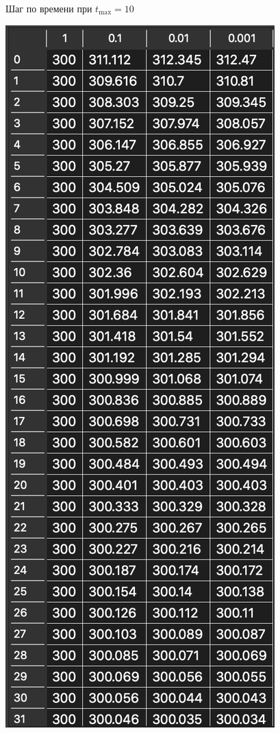 \begin{enumerate}
\begin{minipage}{0.5\textwidth}
\begin{flushleft}
\begin{figure}[H]
                    \caption{Шаг по времени при $t_\text{max} = 10$}
                    \label{img:steptau10}
                \end{figure}
            \end{flushleft}
        \end{minipage}
        \begin{minipage}{0.5\textwidth}
            \begin{flushright}
                \begin{figure}[H]
                    \centering
                    \includegraphics[scale=0.60]{img/steptau100.png}

\end{figure}
\end{flushright}
\end{minipage}
\end{enumerate}
